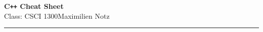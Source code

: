 \documentclass[5pt]{article}
\begin{document}
\begin{center}
     \Large{\textbf{C\texttt{++} Cheat Sheet}}\\
     \small{Class: CSCI 1300}\hfill\small{\textcopyright Maximilien Notz \the\year{}}
     \noindent\rule{20cm}{0.4pt}
\end{center}
\begin{multicols}{2}
\setcounter{secnumdepth}{0}




\end{multicols}
\end{document}
